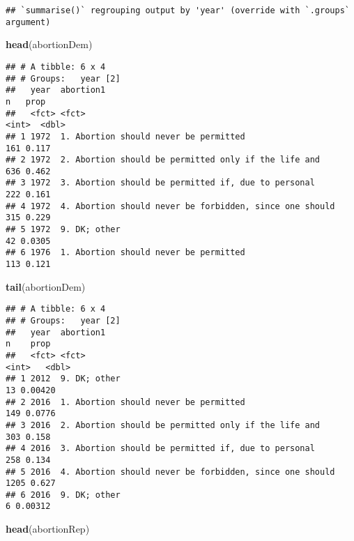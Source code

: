 \documentclass[
]{article}
\newenvironment{Shaded}{\begin{snugshade}}{\end{snugshade}}
\newcommand{\KeywordTok}[1]{\textcolor[rgb]{0.13,0.29,0.53}{\textbf{#1}}}
\newcommand{\NormalTok}[1]{#1}
\begin{document}
\begin{verbatim}
## `summarise()` regrouping output by 'year' (override with `.groups` argument)
\end{verbatim}

\begin{Shaded}
\begin{Highlighting}[]
\KeywordTok{head}\NormalTok{(abortionDem)}
\end{Highlighting}
\end{Shaded}

\begin{verbatim}
## # A tibble: 6 x 4
## # Groups:   year [2]
##   year  abortion1                                                   n   prop
##   <fct> <fct>                                                   <int>  <dbl>
## 1 1972  1. Abortion should never be permitted                     161 0.117 
## 2 1972  2. Abortion should be permitted only if the life and      636 0.462 
## 3 1972  3. Abortion should be permitted if, due to personal       222 0.161 
## 4 1972  4. Abortion should never be forbidden, since one should   315 0.229 
## 5 1972  9. DK; other                                               42 0.0305
## 6 1976  1. Abortion should never be permitted                     113 0.121
\end{verbatim}

\begin{Shaded}
\begin{Highlighting}[]
\KeywordTok{tail}\NormalTok{(abortionDem)}
\end{Highlighting}
\end{Shaded}

\begin{verbatim}
## # A tibble: 6 x 4
## # Groups:   year [2]
##   year  abortion1                                                   n    prop
##   <fct> <fct>                                                   <int>   <dbl>
## 1 2012  9. DK; other                                               13 0.00420
## 2 2016  1. Abortion should never be permitted                     149 0.0776 
## 3 2016  2. Abortion should be permitted only if the life and      303 0.158  
## 4 2016  3. Abortion should be permitted if, due to personal       258 0.134  
## 5 2016  4. Abortion should never be forbidden, since one should  1205 0.627  
## 6 2016  9. DK; other                                                6 0.00312
\end{verbatim}

\begin{Shaded}
\begin{Highlighting}[]
\KeywordTok{head}\NormalTok{(abortionRep)}
\end{Highlighting}
\end{Shaded}
\end{document}
